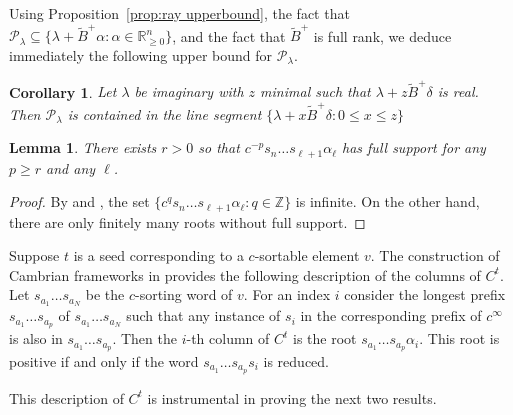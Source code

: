 \documentclass{amsart}
\newcommand{\sayDR}[1]{\say[DR]{\color{red}\;#1}}
\newtheorem{corollary}[theorem]{Corollary}
\newtheorem{lemma}[theorem]{Lemma}
\numberwithin{theorem}{section}
\newcommand{\cP}{\mathcal{P}}
\newcommand{\RR}{\mathbb{R}}
\newcommand{\ZZ}{\mathbb{Z}}
\begin{document}
  Using Proposition~\ref{prop:ray upperbound}, the fact that $\cP_\lambda\subseteq \{\lambda + \widetilde B^+ \alpha : \alpha \in  \RR_{\ge0}^n\}$, and the fact that $\widetilde B^+$ is full rank, we deduce immediately the following upper bound for $\cP_\lambda$.
  \begin{corollary}
    \label{cor:upperbound}
    Let $\lambda$ be imaginary with $z$ minimal such that $\lambda+z\widetilde B^+\delta$ is real.
    Then $\cP_\lambda$ is contained in the line segment $\{\lambda+x\widetilde B^+\delta: 0\le x\le z\}$
  \end{corollary}


  \begin{lemma}
    \label{le:coxeter power}
    There exists $r>0$ so that $c^{-p} s_n \ldots s_{\ell+1} \alpha_\ell$ has full support for any $p\ge r$ and any $\ell$.
  \end{lemma}
  \begin{proof}
    By \cite[Theorem 1.2(1)]{Reading-Stella} and \cite[Section 1]{Dlab-Ringel}, the set $\{c^q s_n \ldots s_{\ell+1} \alpha_\ell:q\in\ZZ\}$ is infinite.
    On the other hand, there are only finitely many roots without full support.
  \end{proof}

  Suppose $t$ is a seed corresponding to a $c$-sortable element $v$.
  The construction of Cambrian frameworks in \cite{Combinatorial_frameworks_for_cluster_algebras} \sayDR{after Prop 5.4} provides the following description of the columns of $C^t$.
  Let $s_{a_1}\dots s_{a_N}$ be the $c$-sorting word of $v$. 
  For an index $i$ consider the longest prefix $s_{a_1} \dots s_{a_p}$ of $s_{a_1}\dots s_{a_N}$ such that any instance of $s_i$ in the corresponding prefix of $c^\infty$ is also in $s_{a_1} \dots s_{a_p}$.
  Then the $i$-th column of $C^t$ is the root $s_{a_1} \dots s_{a_p}\alpha_i$.
  This root is positive if and only if the word $s_{a_1} \dots s_{a_p} s_i$ is reduced.

  This description of $C^t$ is instrumental in proving the next two results.
\end{document}
